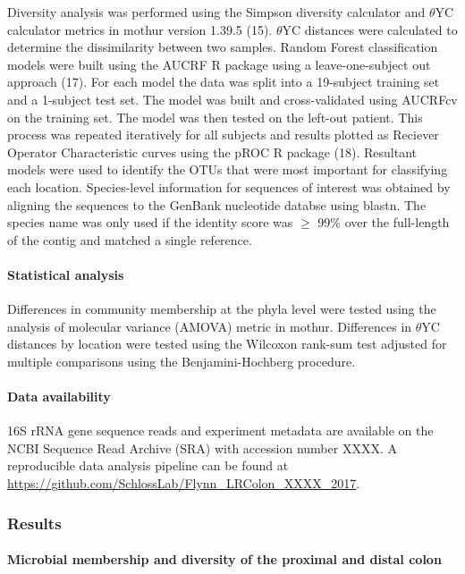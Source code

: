 \documentclass[12pt,]{article}
\let\oldparagraph\paragraph
\renewcommand{\paragraph}[1]{\oldparagraph{#1}\mbox{}}
\begin{document}
Diversity analysis was performed using the Simpson diversity calculator
and \(\theta\)YC calculator metrics in mothur version 1.39.5 (15).
\(\theta\)YC distances were calculated to determine the dissimilarity
between two samples. Random Forest classification models were built
using the AUCRF R package using a leave-one-subject out approach (17).
For each model the data was split into a 19-subject training set and a
1-subject test set. The model was built and cross-validated using
AUCRFcv on the training set. The model was then tested on the left-out
patient. This process was repeated iteratively for all subjects and
results plotted as Reciever Operator Characteristic curves using the
pROC R package (18). Resultant models were used to identify the OTUs
that were most important for classifying each location. Species-level
information for sequences of interest was obtained by aligning the
sequences to the GenBank nucleotide databse using blastn. The species
name was only used if the identity score was \(\ge\) 99\% over the
full-length of the contig and matched a single reference.

\paragraph{Statistical analysis}\label{statistical-analysis}

Differences in community membership at the phyla level were tested using
the analysis of molecular variance (AMOVA) metric in mothur. Differences
in \(\theta\)YC distances by location were tested using the Wilcoxon
rank-sum test adjusted for multiple comparisons using the
Benjamini-Hochberg procedure.

\paragraph{Data availability}\label{data-availability}

16S rRNA gene sequence reads and experiment metadata are available on
the NCBI Sequence Read Archive (SRA) with accession number XXXX. A
reproducible data analysis pipeline can be found at
\url{https://github.com/SchlossLab/Flynn_LRColon_XXXX_2017}.

\subsubsection{Results}\label{results}

\paragraph{Microbial membership and diversity of the proximal and distal
colon}\label{microbial-membership-and-diversity-of-the-proximal-and-distal-colon}
\end{document}
